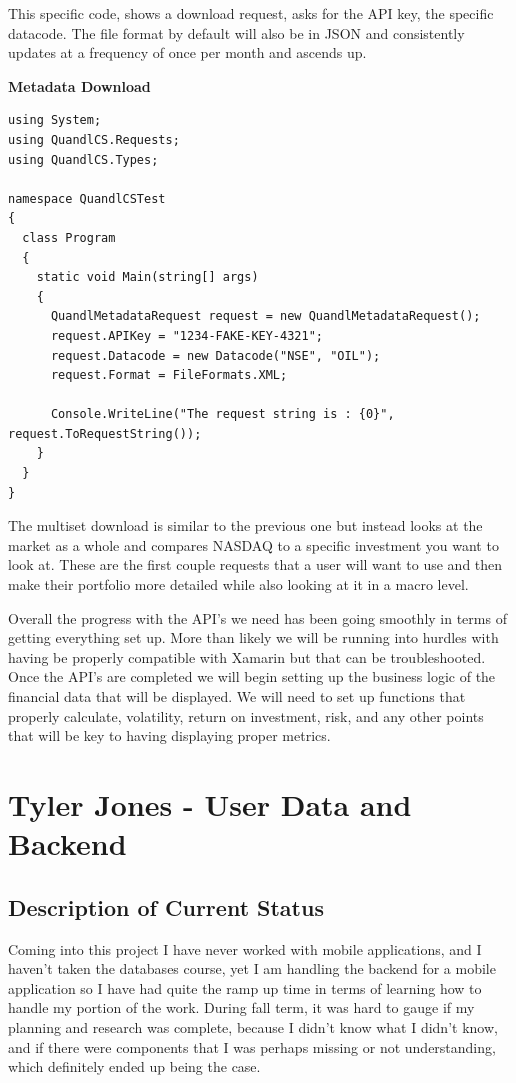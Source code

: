 \documentclass[letterpaper,10pt,titlepage,journal,compsoc,draftclsnofoot,onecolumn]{IEEEtran}
\begin{document}
This specific code, shows a download request, asks for the API key, the specific datacode. The file format by default will also be in JSON and consistently updates at a frequency of once per month and ascends up. 

\textbf{Metadata Download}

\begin{lstlisting}
using System;
using QuandlCS.Requests;
using QuandlCS.Types;

namespace QuandlCSTest
{
  class Program
  {
    static void Main(string[] args)
    {
      QuandlMetadataRequest request = new QuandlMetadataRequest();
      request.APIKey = "1234-FAKE-KEY-4321";
      request.Datacode = new Datacode("NSE", "OIL");      
      request.Format = FileFormats.XML;

      Console.WriteLine("The request string is : {0}", request.ToRequestString());
    }
  }
}
\end{lstlisting}

The multiset download is similar to the previous one but instead looks at the market as a whole and compares NASDAQ to a specific investment you want to look at. These are the first couple requests that a user will want to use and then make their portfolio more detailed while also looking at it in a macro level. 

Overall the progress with the API's we need has been going smoothly in terms of getting everything set up. More than likely we will be running into hurdles with having be properly compatible with Xamarin but that can be troubleshooted. Once the API's are completed we will begin setting up the business logic of the financial data that will be displayed. We will need to set up functions that properly calculate, volatility, return on investment, risk, and any other points that will be key to having displaying proper metrics. 

\section{Tyler Jones - User Data and Backend}

\subsection{Description of Current Status}
 Coming into this project I have never worked with mobile applications, and I haven't taken the databases course, yet I am handling the backend for a mobile application so I have had quite the ramp up time in terms of learning how to handle my portion of the work. During fall term, it was hard to gauge if my planning and research was complete, because I didn't know what I didn't know, and if there were components that I was perhaps missing or not understanding, which definitely ended up being the case. 
\end{document}
